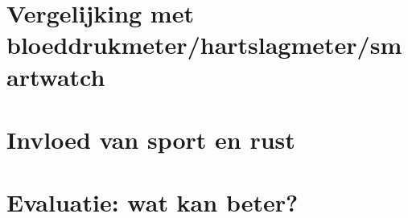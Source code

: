 
\begin{samenvatting}
\end{samenvatting}
%

\section{Vergelijking met bloeddrukmeter/hartslagmeter/smartwatch}
\label{sec:Mod6_Sec1}
%

\section{Invloed van sport en rust}
\label{sec:Mod6_Sec2}
%

\section{Evaluatie: wat kan beter?}
\label{sec:Mod6_Sec3}
%
